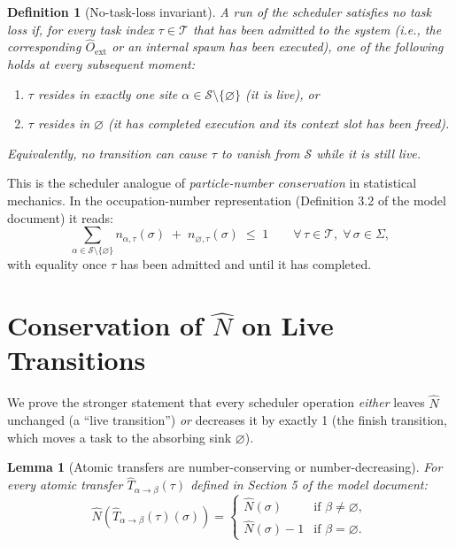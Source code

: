 \documentclass[11pt,a4paper]{report}
\newtheorem{lemma}[theorem]{Lemma}
\newtheorem{definition}{Definition}[section]
\newcommand{\Num}{\hat{N}}
\newcommand{\Trf}[2]{\hat{T}_{#1 \to #2}}
\begin{document}
\begin{definition}[No-task-loss invariant]
\label{def:ntl}
A run of the scheduler satisfies \emph{no task loss} if, for every
task index $\tau \in \mathcal{T}$ that has been admitted to the system
(i.e., the corresponding $\hat{O}_{\text{ext}}$ or an internal spawn
has been executed), one of the following holds at every subsequent
moment:
\begin{enumerate}
  \item $\tau$ resides in exactly one site
        $\alpha \in \mathcal{S} \setminus \{\varnothing\}$ (it is live), or
  \item $\tau$ resides in $\varnothing$ (it has completed execution and
        its context slot has been freed).
\end{enumerate}
Equivalently, no transition can cause $\tau$ to vanish from
$\mathcal{S}$ while it is still live.
\end{definition}

This is the scheduler analogue of \emph{particle-number conservation}
in statistical mechanics.  In the occupation-number representation
(Definition 3.2 of the model document) it reads:
\[
  \sum_{\alpha \in \mathcal{S} \setminus \{\varnothing\}}
  n_{\alpha,\tau}(\sigma) \;+\; n_{\varnothing,\tau}(\sigma)
  \;\leq\; 1
  \qquad \forall\, \tau \in \mathcal{T},\; \forall\, \sigma \in \Sigma,
\]
with equality once $\tau$ has been admitted and until it has
completed.

\section{Conservation of $\Num$ on Live Transitions}

We prove the stronger statement that every scheduler operation
\emph{either} leaves $\Num$ unchanged (a ``live transition'') \emph{or}
decreases it by exactly 1 (the finish transition, which moves a task
to the absorbing sink $\varnothing$).

\begin{lemma}[Atomic transfers are number-conserving or number-decreasing]
\label{lem:atomicconserve}
For every atomic transfer $\Trf{\alpha}{\beta}(\tau)$ defined in
Section 5 of the model document:
\[
  \Num(\Trf{\alpha}{\beta}(\tau)(\sigma)) =
  \begin{cases}
    \Num(\sigma)     & \text{if } \beta \neq \varnothing, \\
    \Num(\sigma) - 1 & \text{if } \beta = \varnothing.
  \end{cases}
\]
\end{lemma}
\end{document}
